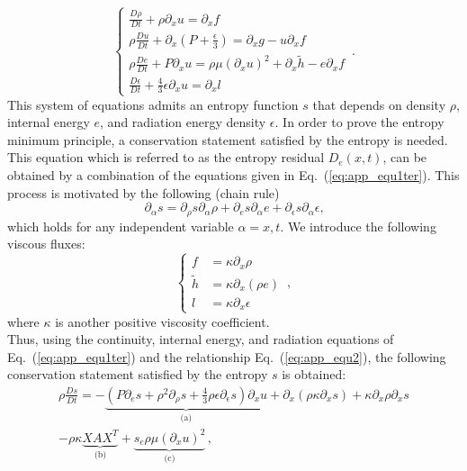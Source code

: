 \documentclass[review]{elsarticle}
\newcommand{\eqt}[1]{Eq.~(\ref{#1})}                     %
\begin{document}
\begin{appendices}
\begin{equation}
\label{eq:app_equ1ter}
\left\{
\begin{array}{llll}
\frac{D \rho}{Dt} + \rho \partial_x u = \partial_x f \\
\rho \frac{Du}{Dt} + \partial_x \left( P + \frac{\epsilon}{3} \right) = \partial_x g - u \partial_x f  \\
\rho \frac{De}{Dt} + P \partial_x u = \rho \mu (\partial_x u)^2 + \partial_x \tilde{h} - e \partial_x f \\
\frac{D\epsilon}{Dt} + \frac{4}{3} \epsilon \partial_x u = \partial_x l
\end{array}
\right. \,.
\end{equation}
This system of equations admits an entropy function $s$ that depends on density $\rho$, internal energy $e$, and radiation energy density $\epsilon$. In order to prove the entropy minimum principle, a conservation statement satisfied by the entropy is needed. This equation which is referred to as the entropy residual $D_e(x,t)$, can be obtained by a combination of the equations given in \eqt{eq:app_equ1ter}. This process is motivated by the following (chain rule) 
\begin{equation}
\label{eq:app_equ2}
\partial_{\alpha} s = \partial_{\rho} s \partial_{\alpha} \rho +  \partial_{e} s \partial_{\alpha}e +  \partial_{\epsilon} s \partial_{\alpha} \epsilon \text{,}
\end{equation}
 which holds for any independent variable $\alpha=x,t$. We introduce the following viscous fluxes:
 \begin{equation}
 \left\{
 \begin{array}{ccc}
f &= \kappa \partial_x \rho \\
\tilde{h} &= \kappa \partial_x (\rho e) \\
l &= \kappa \partial_x \epsilon
 \end{array}
 \right. \,,
 \end{equation}
 where $\kappa$ is another positive viscosity coefficient. \\
 Thus, using the continuity, internal energy, and radiation equations of \eqt{eq:app_equ1ter} and the relationship \eqt{eq:app_equ2}, the following conservation statement satisfied by the entropy $s$ is obtained:
 \begin{multline}
 \label{eq:app_entr_eq_non_equil}
\rho \frac{Ds}{Dt} = - \underbrace{\left( P \partial_e s + \rho^2 \partial_{\rho} s + \frac{4}{3} \rho \epsilon \partial_{\epsilon} s \right) \partial_x u}_\textrm{(a)} + \partial_x \left( \rho \kappa \partial_x s \right) + \kappa \partial_x \rho \partial_x s \\- \rho \kappa \underbrace{X A X^T}_\textrm{(b)} + \underbrace{ s_e \rho \mu (\partial_x u)^2}_\textrm{(c)} \,,

\end{multline}
\end{appendices}
\end{document}
